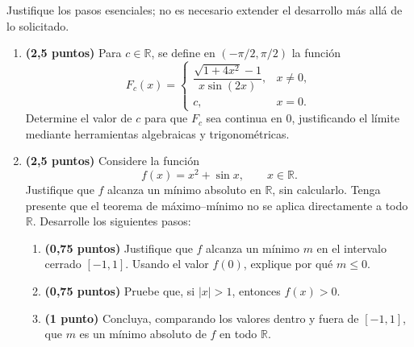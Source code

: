 \documentclass[10pt,a5paper]{article}
\begin{document}
\smallskip
\noindent Justifique los pasos esenciales; no es necesario extender el desarrollo más allá de lo solicitado.
\begin{enumerate}[resume]
  \item \textbf{(2,5 puntos)} Para $c\in\mathbb{R}$, se define en $(-\pi/2,\pi/2)$ la función
  \[
    F_c(x)=\begin{cases}
      \dfrac{\sqrt{1+4x^2}-1}{x\sin(2x)},&x\neq0,\\[2mm]
      c,&x=0.
    \end{cases}
  \]
  Determine el valor de $c$ para que $F_c$ sea continua en $0$, justificando el límite mediante herramientas algebraicas y trigonométricas.

  \item \textbf{(2,5 puntos)} Considere la función
  \[
    f(x)=x^2+\sin x,\qquad x\in\mathbb{R}.
  \]
  Justifique que $f$ alcanza un mínimo absoluto en $\mathbb{R}$, sin calcularlo. Tenga presente que el teorema de máximo--mínimo no se aplica directamente a todo $\mathbb{R}$.
  Desarrolle los siguientes pasos:
  \begin{enumerate}
    \item \textbf{(0,75 puntos)} Justifique que $f$ alcanza un mínimo $m$ en el intervalo cerrado $[-1,1]$. Usando el valor $f(0)$, explique por qué $m\leq0$.
    \item \textbf{(0,75 puntos)} Pruebe que, si $|x|>1$, entonces $f(x)>0$.
    \item \textbf{(1 punto)} Concluya, comparando los valores dentro y fuera de $[-1,1]$, que $m$ es un mínimo absoluto de $f$ en todo $\mathbb{R}$.
  \end{enumerate}
\end{enumerate}
\end{document}
